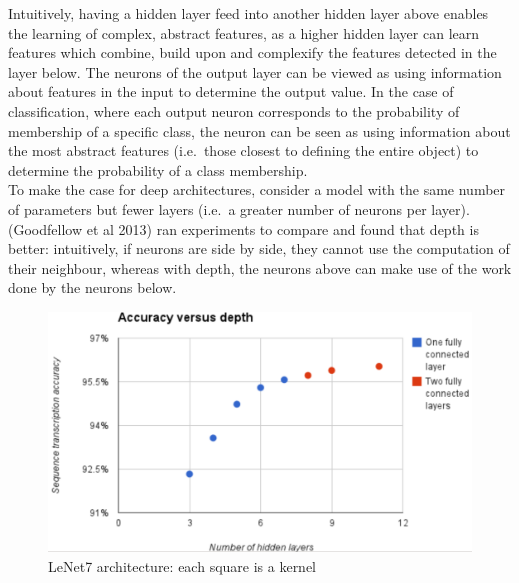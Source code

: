 \documentclass[a4paper,11pt]{article}
\begin{document}
Intuitively, having a hidden layer feed into another hidden layer above enables the learning of complex, abstract features, as a higher hidden layer can learn features which combine, build upon and complexify the features detected in the layer below. The neurons of the output layer can be viewed as using information about features in the input to determine the output value. In the case of classification, where each output neuron corresponds to the probability of membership of a specific class, the neuron can be seen as using information about the most abstract features (i.e.\ those closest to defining the entire object) to determine the probability of a class membership. \\

To make the case for deep architectures, consider a model with the same number of parameters but fewer layers (i.e.\ a greater number of neurons per layer). (Goodfellow et al 2013) \cite{goodfellow_street_view} ran experiments to compare and found that depth is better: intuitively, if neurons are side by side, they cannot use the computation of their neighbour, whereas with depth, the neurons above can make use of the work done by the neurons below. \\	

\begin{figure}[h!]
	\centering
	\includegraphics[scale=0.3]{images/more_layers_better.png}
	\caption{LeNet7 architecture: each square is a kernel}
\end{figure}
\end{document}
